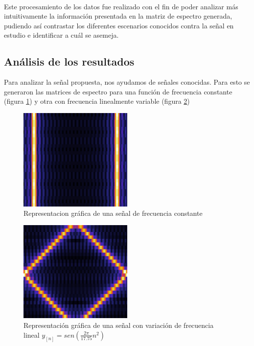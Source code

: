 \documentclass{article}
\begin{document}
	        \paragraph{}

	        \paragraph{}
	        Este procesamiento de los datos fue realizado con el fin de poder analizar más intuitivamente la información presentada en la matriz de espectro generada, 
	        pudiendo así contrastar los diferentes escenarios conocidos contra la señal en estudio e identificar a cuál se asemeja.
	        
	\subsection{Análisis de los resultados}
	        
	        Para analizar la señal propuesta, nos ayudamos de señales conocidas. Para esto se generaron las matrices de espectro para una función de frecuencia constante (figura \ref{constante}) y otra con frecuencia linealmente variable (figura \ref{variable})
	
	        \begin{figure}[h!]
	            \centering
	            \includegraphics[width=0.5\textwidth]{./Imagenes/Espectrogramas/constante.jpg}
	            \caption{Representacion gráfica de una señal de frecuencia constante}
	            \label{constante}
	        \end{figure}
	
	        \begin{figure}[h!]
	            \centering
	            \includegraphics[width=0.5\textwidth]{./Imagenes/Espectrogramas/variable.jpg}
	            \caption{Representación gráfica de una señal con variación de frecuencia lineal $y_{[n]} = sen(\frac{2\pi}{17.75}n^2)$}
	            \label{variable}
	        \end{figure}
	
\end{document}
